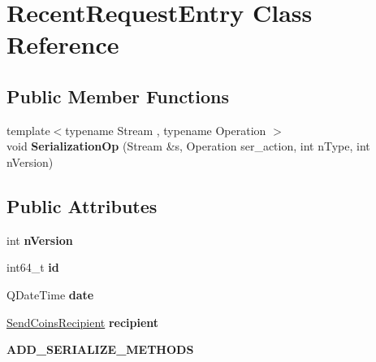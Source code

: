 \hypertarget{class_recent_request_entry}{}\section{Recent\+Request\+Entry Class Reference}
\label{class_recent_request_entry}
\subsection*{Public Member Functions}
\begin{DoxyCompactItemize}
\item 
\mbox{\label{class_recent_request_entry_ae4ae010244f0fc530949900af3de5493}} 
{\footnotesize template$<$typename Stream , typename Operation $>$ }\\void {\bfseries Serialization\+Op} (Stream \&s, Operation ser\+\_\+action, int n\+Type, int n\+Version)
\end{DoxyCompactItemize}
\subsection*{Public Attributes}
\begin{DoxyCompactItemize}
\item 
\mbox{\label{class_recent_request_entry_afaaea4ce5649d760100ed4ecd9933fe9}} 
int {\bfseries n\+Version}
\item 
\mbox{\label{class_recent_request_entry_a1d45d3b6deb1440ef004d58972138e43}} 
int64\+\_\+t {\bfseries id}
\item 
\mbox{\label{class_recent_request_entry_afcb2932f003da4b09f9d595cd3e1e98f}} 
Q\+Date\+Time {\bfseries date}
\item 
\mbox{\label{class_recent_request_entry_a8a01ad96cb5b7e4df2bbfe0a89cad4b1}} 
\mbox{\hyperlink{class_send_coins_recipient}{Send\+Coins\+Recipient}} {\bfseries recipient}
\item 
\mbox{\label{class_recent_request_entry_a614e900269d93719d979bbb85170978a}} 
{\bfseries A\+D\+D\+\_\+\+S\+E\+R\+I\+A\+L\+I\+Z\+E\+\_\+\+M\+E\+T\+H\+O\+DS}
\end{DoxyCompactItemize}
